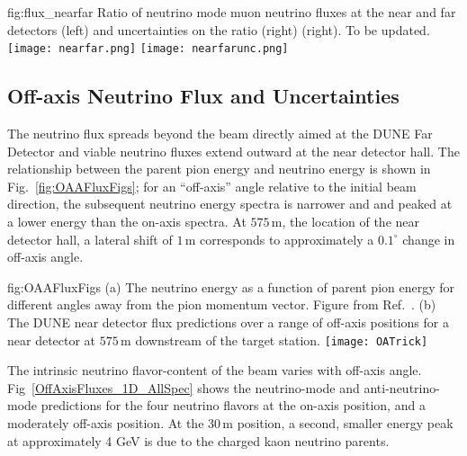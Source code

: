 \begin{dunefigure}{fig:flux_nearfar}
{Ratio of neutrino mode muon neutrino fluxes at the near and far detectors (left) and uncertainties on the ratio (right) (right).  To be updated. }
    \texttt{[image: nearfar.png]}
     \texttt{[image: nearfarunc.png]}
\end{dunefigure}


\subsection{Off-axis Neutrino Flux and Uncertainties}

The neutrino flux spreads beyond the beam directly aimed at the DUNE Far Detector and viable neutrino fluxes extend outward at the near detector hall. The relationship between the parent pion energy and neutrino energy is shown in Fig.~\ref{fig:OAAFluxFigs}; for an ``off-axis'' angle relative to the initial beam direction, the subsequent neutrino energy spectra is narrower and and peaked at a lower energy than the on-axis spectra. At $575\,\textrm{m}$, the location of the near detector hall, a lateral shift of $1\,\textrm{m}$ corresponds to approximately a $0.1^\circ$ change in off-axis angle.

\begin{dunefigure}{fig:OAAFluxFigs}
{(a) The neutrino energy as a function of parent pion energy for different angles away from the pion momentum vector. Figure from Ref.~\cite{Duffy:2016owt}. (b) The DUNE near detector flux predictions over a range of off-axis positions for a near detector at $575\,\textrm{m}$ downstream of the target station. }
    \texttt{[image: OATrick]}
\end{dunefigure}

The intrinsic neutrino flavor-content of the beam varies with off-axis angle. Fig~\ref{OffAxisFluxes_1D_AllSpec} shows the neutrino-mode and anti-neutrino-mode predictions for the four neutrino flavors at the on-axis position, and a moderately off-axis position. At the $30\,\textrm{m}$ position, a second, smaller energy peak at approximately 4 GeV is due to the charged kaon neutrino parents. 

